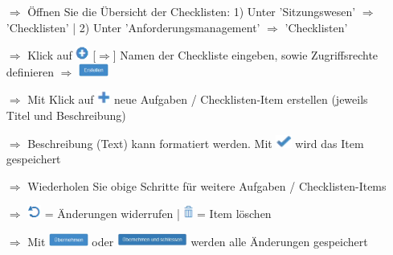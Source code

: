 \documentclass{article}
\begin{document}
\begin{multicols}{2}

\begin{tcolorbox}[colback=blue!5,colframe=blue!40!black,title=\textbf{Neue Checkliste erstellen}]
\begin{itemize}
  \item[$\Longrightarrow$] Öffnen Sie die Übersicht der Checklisten: 1) Unter 'Sitzungswesen' $\Rightarrow$ 'Checklisten' | 2) Unter 'Anforderungsmanagement' $\Longrightarrow$ 'Checklisten'
  \item[$\Longrightarrow$] Klick auf \includegraphics[height=12pt]{Icons/Plussymbol.png} [$\Rightarrow$] Namen der Checkliste eingeben, sowie Zugriffsrechte definieren $\Rightarrow$ \includegraphics[height=12pt]{Icons/B_Erstellen.jpg}
  \item[$\Longrightarrow$] Mit Klick auf \includegraphics[height=12pt]{Icons/Pluszeichen.png} neue Aufgaben / Checklisten-Item erstellen (jeweils Titel und Beschreibung)
	\item[$\Longrightarrow$] Beschreibung (Text) kann formatiert werden. Mit \includegraphics[height=12pt]{Icons/Gutzeichen.png} wird das Item gespeichert
  \item[$\Longrightarrow$] Wiederholen Sie obige Schritte für weitere Aufgaben / Checklisten-Items
  \item[$\Longrightarrow$] \includegraphics[height=12pt]{Icons/Refresh.png}	= Änderungen widerrufen | \includegraphics[height=12pt]{Icons/Muelltonne.png} = Item löschen
	\item[$\Longrightarrow$] Mit \includegraphics[height=12pt]{Icons/B_Uebernehmen.jpg} oder \includegraphics[height=12pt]{Icons/ueb_schliessen.png} werden alle Änderungen gespeichert
\end{itemize}
\end{tcolorbox}


\end{multicols}
\end{document}
